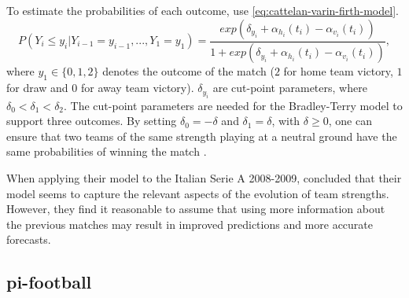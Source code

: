 To estimate the probabilities of each outcome, \citet{bib:cattelan-varin-firth-2013} use \cref{eq:cattelan-varin-firth-model}.
\begin{equation}
    P(Y_{i} \leq y_{i} | Y_{i-1} = y_{i-1}, ..., Y_{1} = y_{1}) = \frac{exp(\delta_{y_{i}} + \alpha_{h_{i}}(t_{i}) - \alpha_{v_{i}}(t_{i}))}{1 + exp(\delta_{y_{i}} + \alpha_{h_{i}}(t_{i}) - \alpha_{v_{i}}(t_{i}))},
    \label{eq:cattelan-varin-firth-model}
\end{equation}
where $y_{1} \in \{0, 1, 2\}$ denotes the outcome of the match ($2$ for home team victory, $1$ for draw and $0$ for away team victory). $\delta_{y_{i}}$ are cut-point parameters, where $\delta_{0} < \delta_{1} < \delta_{2}$. The cut-point parameters are needed for the Bradley-Terry model to support three outcomes. By setting $\delta_{0} = -\delta$ and $\delta_{1} = \delta$, with $\delta \geq 0$, one can ensure that two teams of the same strength playing at a neutral ground have the same probabilities of winning the match \citep{bib:cattelan-varin-firth-2013}.

When applying their model to the Italian Serie A 2008-2009, \citet{bib:cattelan-varin-firth-2013} concluded that their model seems to capture the relevant aspects of the evolution of team strengths. However, they find it reasonable to assume that using more information about the previous matches may result in improved predictions and more accurate forecasts.


\subsection{pi-football}
\label{subsec:pi-football}

